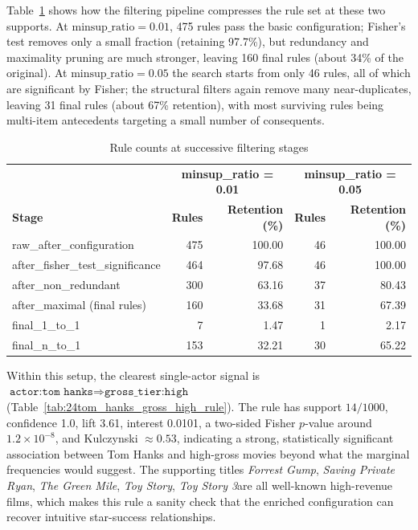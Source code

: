 \documentclass{article}  %
\begin{document}
Table~\ref{tab:23rule_pipeline_counts_combined} shows how the filtering pipeline compresses the rule set at these two supports. At \(\text{minsup\_ratio} = 0.01\), 475 rules pass the basic configuration; Fisher’s test removes only a small fraction (retaining 97.7\%), but redundancy and maximality pruning are much stronger, leaving 160 final rules (about 34\% of the original). At \(\text{minsup\_ratio} = 0.05\) the search starts from only 46 rules, all of which are significant by Fisher; the structural filters again remove many near-duplicates, leaving 31 final rules (about 67\% retention), with most surviving rules being multi-item antecedents targeting a small number of consequents.
\begin{table}[!htbp]
    \caption{ Rule counts at successive filtering stages}
    \centering
    \begin{tabular}{l r r r r}
        \toprule
        & \multicolumn{2}{c}{\textbf{minsup\_ratio = 0.01}} &
          \multicolumn{2}{c}{\textbf{minsup\_ratio = 0.05}} \\
        \textbf{Stage}&
        \textbf{Rules} & \textbf{Retention (\%)} &
        \textbf{Rules} & \textbf{Retention (\%)} \\
        \midrule
        raw\_after\_configuration        & 475 & 100.00 & 46 & 100.00 \\
        after\_fisher\_test\_significance & 464 & 97.68  & 46 & 100.00 \\
        after\_non\_redundant            & 300 & 63.16  & 37 & 80.43 \\
        after\_maximal (final rules)     & 160 & 33.68  & 31 & 67.39 \\
        final\_1\_to\_1                  & 7   & 1.47   & 1  & 2.17  \\
        final\_n\_to\_1                  & 153 & 32.21 & 30 & 65.22 \\
        \bottomrule
    \end{tabular}
    \label{tab:23rule_pipeline_counts_combined}
\end{table}


Within this setup, the clearest single-actor signal is \(\texttt{actor:tom hanks} \Rightarrow \texttt{gross\_tier:high}\) (Table~\ref{tab:24tom_hanks_gross_high_rule}). The rule has support \(14/1000\), confidence 1.0, lift 3.61, interest 0.0101, a two-sided Fisher \(p\)-value around \(1.2 \times 10^{-8}\), and Kulczynski \(\approx 0.53\), indicating a strong, statistically significant association between Tom Hanks and high-gross movies beyond what the marginal frequencies would suggest. The supporting titles \emph{Forrest Gump}, \emph{Saving Private Ryan}, \emph{The Green Mile}, \emph{Toy Story}, \emph{Toy Story 3}are all well-known high-revenue films, which makes this rule a sanity check that the enriched configuration can recover intuitive star-success relationships.
\end{document}

